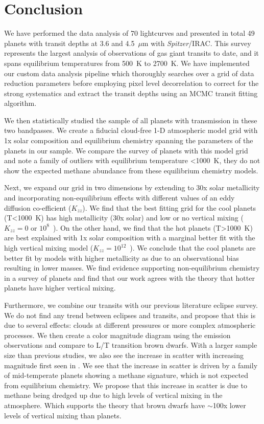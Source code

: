 \section{Conclusion}
\label{P1:sec:conclusion}

We have performed the data analysis of 70 lightcurves and presented in total 49 planets with transit depths at 3.6 and 4.5~$\mu$m with \textit{Spitzer}/IRAC. This survey represents the largest analysis of \spitzerIRAC observations of gas giant transits to date, and it spans equilibrium temperatures from 500~K to 2700~K. We have implemented our custom \spitzerIRAC data analysis pipeline which thoroughly searches over a grid of data reduction parameters before employing pixel level decorrelation \citep{Deming2015} to correct for the strong \spitzer systematics and extract the transit depths using an MCMC transit fitting algorithm.

We then statistically studied the sample of all planets with transmission in these two bandpasses. We create a fiducial cloud-free 1-D atmospheric model grid with 1x solar composition and equilibrium chemistry spanning the parameters of the planets in our sample. We compare the survey of planets with this model grid and note a family of outliers with equilibrium temperature <1000~K, they do not show the expected methane abundance from these equilibrium chemistry models.

Next, we expand our grid in two dimensions by extending to 30x solar metallicity and incorporating non-equilibrium effects with different values of an eddy diffusion co-efficient ($K_{zz}$). We find that the best fitting grid for the cool planets (T<1000~K) has high metallicity (30x solar) and low or no vertical mixing ($K_{zz}=0$ or $10^8$~\cmcms). On the other hand, we find that the hot planets (T>1000~K) are best explained with 1x solar composition with a marginal better fit with the high vertical mixing model ($K_{zz}=10^{12}$~\cmcms). We conclude that the cool planets are better fit by models with higher metallicity as due to an observational bias resulting in lower masses. We find evidence supporting non-equilibrium chemistry in a survey of planets and find that our work agrees with the theory that hotter planets have higher vertical mixing.

Furthermore, we combine our transits with our previous literature eclipse survey. We do not find any trend between eclipses and transits, and propose that this is due to several effects: clouds at different pressures or more complex atmospheric processes. We then create a color magnitude diagram using the emission observations and compare to L/T transition brown dwarfs. With a larger sample size than previous studies, we also see the increase in scatter with increasing magnitude first seen in \citet{Triaud2014c}. We see that the increase in scatter is driven by a family of mid-temperate planets showing a methane signature, which is not expected from equilibrium chemistry. We propose that this increase in scatter is due to methane being dredged up due to high levels of vertical mixing in the atmosphere. Which supports the theory that brown dwarfs have $\sim$100x lower levels of vertical mixing than planets.

